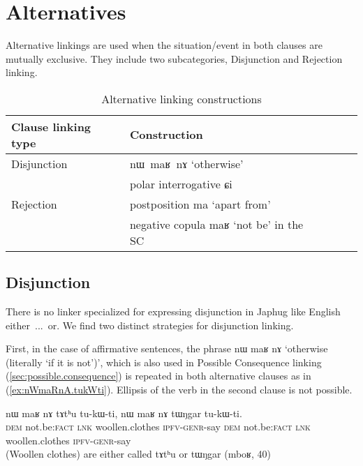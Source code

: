 \documentclass[oldfontcommands,oneside,a4paper,11pt]{article}
\newcommand{\ipa}[1]{{\phon \mbox{#1}}} %
\newcommand{\refb}[1]{(\ref{#1})}
\begin{document}
\section{Alternatives}
Alternative linkings are used when the situation/event in both clauses are mutually exclusive. They include two subcategories,  Disjunction and Rejection linking.  



\begin{table}[h]
\caption{Alternative linking constructions} \label{tab:alternative}
\begin{tabular}{lllll}
\toprule
 Clause linking type &Construction \\
\midrule
Disjunction & \ipa{nɯ maʁ nɤ} `otherwise'\\
& polar interrogative \ipa{ɕi}\\
\midrule
Rejection& postposition \ipa{ma} `apart from' \\
& negative copula \ipa{maʁ} `not be' in the SC\\
\bottomrule
\end{tabular}
\end{table}


\subsection{Disjunction}
There is no linker specialized for expressing disjunction in Japhug like English \ipa{either ... or}. We find two distinct strategies for disjunction linking.

First, in the case of affirmative sentences, the phrase \ipa{nɯ}    	\ipa{maʁ}    	\ipa{nɤ}  `otherwise (literally `if it is not')', which is also used in Possible Consequence linking \refb{sec:possible.consequence} is repeated in both alternative clauses as in \refb{ex:nWmaRnA.tukWti}. Ellipsis of the verb in the second clause  is not possible.
\begin{exe}
\ex \label{ex:nWmaRnA.tukWti}
\gll 
\ipa{nɯ}    	\ipa{maʁ}    	\ipa{nɤ}    	\ipa{tɤtʰu}    	\ipa{tu-kɯ-ti,}    	\ipa{nɯ}    	\ipa{maʁ}    	\ipa{nɤ}    	\ipa{tɯŋgar}    	\ipa{tu-kɯ-ti.}    \\
\textsc{dem}  not.be:\textsc{fact} \textsc{lnk} woollen.clothes \textsc{ipfv-genr}-say \textsc{dem} not.be:\textsc{fact} \textsc{lnk} woollen.clothes \textsc{ipfv-genr}-say \\
\glt (Woollen clothes) are either called \ipa{tɤtʰu}  or \ipa{tɯŋgar}    (mboʁ, 40)
 \end{exe}
\end{document}
